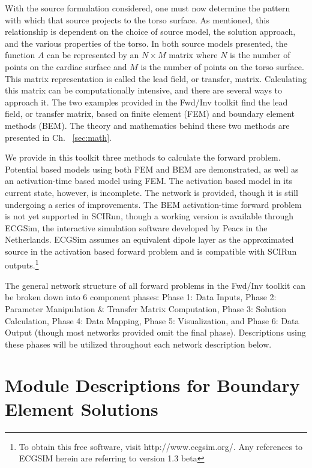 With the source formulation considered, one must now determine the pattern with which that source projects to the torso surface. As mentioned, this relationship is dependent on the choice of source model, the solution approach, and the various properties of the torso. In both source models presented, the function $A$ can be represented by an $N \times M$ matrix where $N$ is the number of points on the cardiac surface and $M$ is the number of points on the torso surface.  This matrix representation is called the lead field, or transfer, matrix. Calculating this matrix can be computationally intensive, and there are several ways to approach it. The two examples provided in the Fwd/Inv toolkit find the lead field, or transfer matrix, based on finite element (FEM) and boundary element methods (BEM). The theory and mathematics behind these two methods are presented in Ch. ~\ref{sec:math}.

We provide in this toolkit three methods to calculate the forward problem. Potential based models using both FEM and BEM are demonstrated, as well as an activation-time based model using FEM. 
The activation based model in its current state, however, is incomplete. 
The network is provided, though it is still undergoing a series of improvements. 
The BEM activation-time forward problem is not yet supported in SCIRun, though a working version is available through ECGSim, the interactive simulation software developed by Peacs in the Netherlands. ECGSim assumes an equivalent dipole layer as the approximated source in the activation based forward problem and is compatible with SCIRun outputs.\footnote{To obtain this free software, visit http://www.ecgsim.org/. Any references to ECGSIM herein are referring to version 1.3 beta}

The general network structure of all forward problems in the Fwd/Inv toolkit can be broken down into 6 component phases: Phase 1: Data Inputs, Phase 2: Parameter Manipulation \& Transfer Matrix Computation, Phase 3: Solution Calculation, Phase 4: Data Mapping, Phase 5: Visualization, and Phase 6: Data Output (though most networks provided omit the final phase).  
Descriptions using these phases will be utilized throughout each network description below.

\section{Module Descriptions for Boundary Element Solutions}

